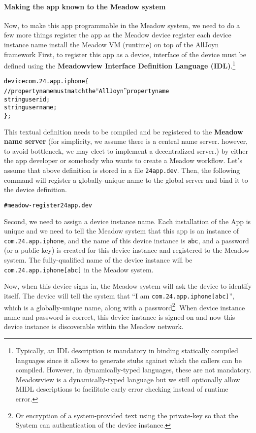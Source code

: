 \documentclass{note}
\begin{document}
\paragraph{Making the app known to the Meadow system}
Now, to make this app programmable in the Meadow system, we need to do
a few more things
  \bit
  \w register the app as the Meadow device
  \w register each device instance name
  \w install the Meadow VM (runtime) on top of the AllJoyn framework
  \eit
First, to register this app as a device, interface of the device must be
defined using the \textcolor{blue2}{\textbf{Meadowview Interface Definition
    Language (IDL)}}.\footnote{Typically, an IDL description is mandatory in
  binding statically compiled languages since it allows to generate stubs
  against which the callers can be compiled. However, in dynamically-typed
  languages, these are not mandatory. Meadowview is a dynamically-typed
  language but we still optionally allow MIDL descriptions to facilitate early
  error checking instead of runtime error.}
\begin{alltt}
  \textcolor{black}{device com.24.app.iphone \{
    // property name must match the ``AllJoyn'' property name
    string userid;
    string username;
  \};}
\end{alltt}
This textual definition needs to be compiled and be registered to the
\textcolor{blue2}{\bf Meadow name server} (for simplicity, we assume there is a central name
server. however, to avoid bottleneck, we may elect to implement a 
decentralized server.) by either the app developer or somebody who wants to
create a Meadow workflow. Let's assume that above definition is stored in
a file \verb+24app.dev+. 
Then, the following command will register a globally-unique name to the global
server and bind it to the device definition.
\begin{alltt}
  \textcolor{black}{# meadow-register 24app.dev}
\end{alltt}

Second, we need to assign a device instance name. Each installation of the
App is unique and we need to tell the Meadow system that
\bit
\w this app is an instance of \verb+com.24.app.iphone+, and
\w the name of this device instance is \verb+abc+, and
\w a password (or a public-key) is created for this device instance 
   and registered to the Meadow system. 
\eit
The fully-qualified name of the device instance will be
\verb+com.24.app.iphone[abc]+ in the Meadow system. 

Now, when this device signs in, the Meadow system will ask the device to
identify itself. The device will tell the system that ``I am
\verb+com.24.app.iphone[abc]+'', which is a globally-unique name, along with a
password\footnote{Or encryption of a system-provided text using the
  private-key so that the System can authentication of the device instance.}. 
When device instance name and password is correct, this device instance is
signed on and now this device instance is discoverable within the Meadow
network. 
\end{document}
